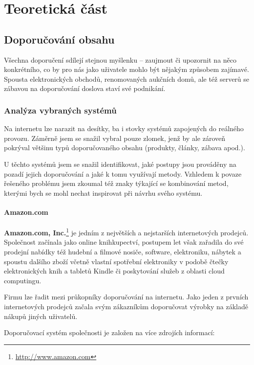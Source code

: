 \documentclass[thesis=M,czech]{FITthesis}[2014/05/07]
\begin{document}
\chapter{Teoretická část}		
\label{chap:teor}

\section{Doporučování obsahu}	
\label{chap:current}

Všechna doporučení sdílejí stejnou myšlenku – zaujmout či upozornit na něco konkrétního, co by pro nás jako uživatele mohlo být nějakým způsobem zajímavé. Spousta elektronických obchodů, renomovaných aukčních domů, ale též serverů se zábavou na doporučování doslova staví své podnikání.

\subsection{Analýza vybraných systémů}
\label{sec:examples}
Na internetu lze narazit na desítky, ba i stovky systémů zapojených do reálného provozu. Záměrně jsem se snažil vybral pouze zlomek, jenž by ale zároveň pokrýval většinu typů doporučovaného obsahu (produkty, články, zábava apod.).

U těchto systémů jsem se snažil identifikovat, jaké postupy jsou prováděny na pozadí jejich doporučování a jaké k tomu využívají metody. Vzhledem k povaze řešeného problému jsem zkoumal též znaky týkající se kombinování metod, kterými bych se mohl nechat inspirovat při návrhu svého systému.

\subsubsection{Amazon.com}

\textbf{Amazon.com, Inc.}\footnote{\url{http://www.amazon.com}} je jedním z největších a nejstarších internetových prodejců. Společnost začínala jako online knihkupectví, postupem let však zařadila do své prodejní nabídky též hudební a filmové nosiče, software, elektroniku, nábytek a spoustu dalšího zboží včetně vlastní spotřební elektroniky v podobě čtečky elektronických knih a tabletů Kindle či poskytování služeb z oblasti cloud computingu.

Firmu lze řadit mezi průkopníky doporučování na internetu. Jako jeden z prvních internetových prodejců začala svým zákazníkům doporučovat výrobky na základě nákupů jiných uživatelů.

Doporučovací systém společnosti je založen na více zdrojích informací:
\end{document}
